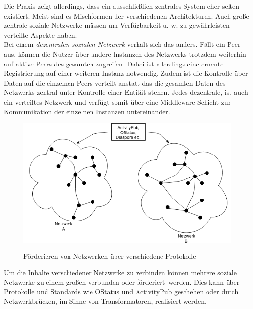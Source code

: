 	Die Praxis zeigt allerdings, dass ein ausschließlich zentrales System eher selten existiert. Meist sind es Mischformen der verschiedenen Architekturen. Auch große zentrale soziale Netzwerke müssen um Verfügbarkeit u. w. zu gewährleisten verteilte Aspekte haben.\\
	
	Bei einem \textit{dezentralen sozialen Netzwerk} verhält sich das anders. Fällt ein Peer aus, können die Nutzer über andere Instanzen des Netzwerks trotzdem weiterhin auf aktive Peers des gesamten zugreifen. Dabei ist allerdings eine erneute Registrierung auf einer weiteren Instanz notwendig. Zudem ist die Kontrolle über Daten auf die einzelnen Peers verteilt anstatt das die gesamten Daten des Netzwerks zentral unter Kontrolle einer Entität stehen. Jedes dezentrale, ist auch ein verteiltes Netzwerk und verfügt somit über eine Middleware Schicht zur Kommunikation der einzelnen Instanzen untereinander.\\
	\begin{figure}[h]
		\begin{minipage}{\textwidth}
			\centering
			\includegraphics[scale=0.5]{figures/federate.png}
			\label{fig:federated}
			\caption{Förderieren von Netzwerken über verschiedene Protokolle}
		\end{minipage}
	\end{figure}
	Um die Inhalte verschiedener Netzwerke zu verbinden können mehrere soziale Netzwerke zu einem großen verbunden oder \glqq förderiert\grqq~werden. Dies kann über Protokolle und Standards wie OStatus und ActivityPub geschehen oder durch Netzwerkbrücken, im Sinne von Transformatoren, realisiert werden.\\
	
